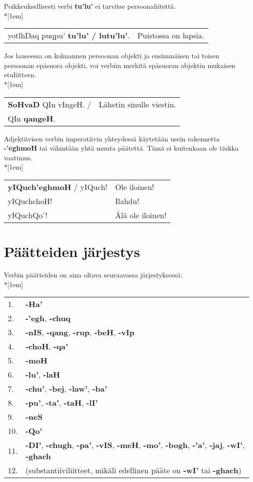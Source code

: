 \documentclass{book}
\begin{document}
Poikkeuksellisesti verbi \textbf{tu'lu'} ei tarvitse persoonaliitettä.
\\*[1em]
\begin{tabular}{l l}
    yotlhDaq puqpu' \textbf{tu'lu' / lutu'lu'}. & Puistossa on lapsia. \\
\end{tabular}

Jos lauseessa on kolmannen persoonan objekti ja ensimmäisen tai toisen persoonan epäsuora objekti, voi verbiin merkitä epäsuoran objektin mukaisen etuliitteen.\\*[1em]
\begin{tabular}{l l}
    \textbf{SoHvaD} QIn vIngeH. / & Lähetin sinulle viestin. \\
    QIn \textbf{qangeH}.
\end{tabular}

Adjektiivisen verbin imperatiivin yhteydessä käytetään usein rakennetta \textbf{-'eghmoH} tai vähintään yhtä muuta päätettä. Tämä ei kuitenkaan ole tiukka vaatimus.\\*[1em]
\begin{tabular}{l l}
    \textbf{yIQuch'eghmoH} / yIQuch! & Ole iloinen! \\
    yIQuchchoH! & Ilahdu! \\
    yIQuchQo'! & Älä ole iloinen! \\
\end{tabular}

\section{Päätteiden järjestys}

Verbin päätteiden on aina oltava seuraavassa järjestyksessä:\\*[1em]
\begin{tabular}{l l}
    1. & \textbf{-Ha'} \\
    2. & \textbf{-'egh}, \textbf{-chuq} \\
    3. & \textbf{-nIS}, \textbf{-qang}, \textbf{-rup}, \textbf{-beH}, \textbf{-vIp} \\
    4. & \textbf{-choH}, \textbf{-qa'} \\
    5. & \textbf{-moH} \\
    6. & \textbf{-lu'}, \textbf{-laH} \\
    7. & \textbf{-chu'}, \textbf{-bej}, \textbf{-law'}, \textbf{-ba'} \\
    8. & \textbf{-pu'}, \textbf{-ta'}, \textbf{-taH}, \textbf{-lI'} \\
    9. & \textbf{-neS} \\
    10. & \textbf{-Qo'} \\
    11. & \textbf{-DI'}, \textbf{-chugh}, \textbf{-pa'}, \textbf{-vIS}, \textbf{-meH}, \textbf{-mo'}, \textbf{-bogh}, \textbf{-'a'}, \textbf{-jaj}, \textbf{-wI'}, \textbf{-ghach} \\
    12. & (substantiiviliitteet, mikäli edellinen pääte on \textbf{-wI'} tai \textbf{-ghach}) \\
\end{tabular}
\end{document}
